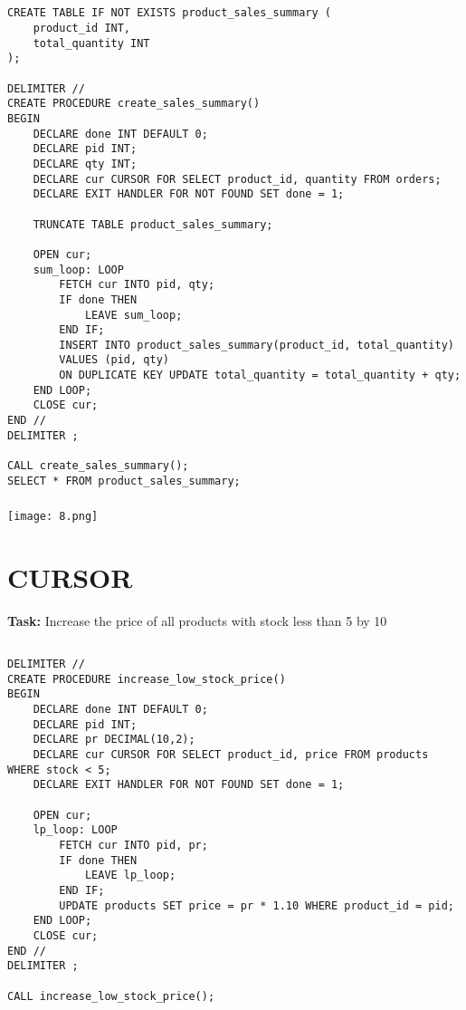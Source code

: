 \documentclass[12pt,a4paper]{article}
\begin{document}
\subsection{}
\begin{lstlisting}
CREATE TABLE IF NOT EXISTS product_sales_summary (
    product_id INT,
    total_quantity INT
);

DELIMITER //
CREATE PROCEDURE create_sales_summary()
BEGIN
    DECLARE done INT DEFAULT 0;
    DECLARE pid INT;
    DECLARE qty INT;
    DECLARE cur CURSOR FOR SELECT product_id, quantity FROM orders;
    DECLARE EXIT HANDLER FOR NOT FOUND SET done = 1;

    TRUNCATE TABLE product_sales_summary;

    OPEN cur;
    sum_loop: LOOP
        FETCH cur INTO pid, qty;
        IF done THEN
            LEAVE sum_loop;
        END IF;
        INSERT INTO product_sales_summary(product_id, total_quantity)
        VALUES (pid, qty)
        ON DUPLICATE KEY UPDATE total_quantity = total_quantity + qty;
    END LOOP;
    CLOSE cur;
END //
DELIMITER ;

CALL create_sales_summary();
SELECT * FROM product_sales_summary;

\end{lstlisting}

\subsubsection{}
\begin{center}
    \texttt{[image: 8.png]}
\end{center}


\section{CURSOR}
\textbf{Task:} Increase the price of all products with stock less than 5 by 10%

\subsection{}
\begin{lstlisting}
DELIMITER //
CREATE PROCEDURE increase_low_stock_price()
BEGIN
    DECLARE done INT DEFAULT 0;
    DECLARE pid INT;
    DECLARE pr DECIMAL(10,2);
    DECLARE cur CURSOR FOR SELECT product_id, price FROM products WHERE stock < 5;
    DECLARE EXIT HANDLER FOR NOT FOUND SET done = 1;

    OPEN cur;
    lp_loop: LOOP
        FETCH cur INTO pid, pr;
        IF done THEN
            LEAVE lp_loop;
        END IF;
        UPDATE products SET price = pr * 1.10 WHERE product_id = pid;
    END LOOP;
    CLOSE cur;
END //
DELIMITER ;

CALL increase_low_stock_price();

\end{lstlisting}
\end{document}
